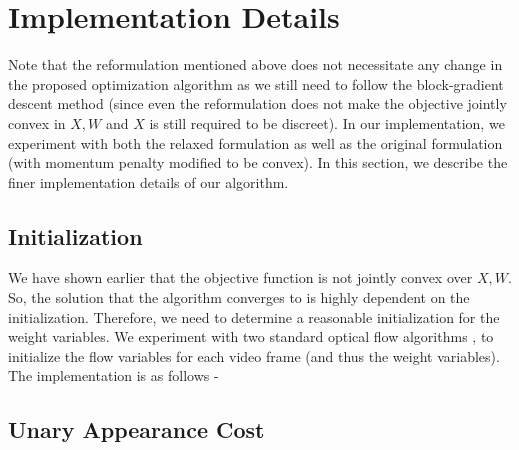 \section{Implementation Details}

Note that the reformulation mentioned above does not necessitate any
change in the proposed optimization algorithm as we still need to
follow the block-gradient descent method (since even the reformulation
does not make the objective jointly convex in $X,W$ and $X$ is still
required to be discreet). In our implementation, we experiment with both the relaxed formulation as well as the original formulation (with momentum penalty modified to be convex). In this section, we describe the finer implementation details of our algorithm.


\subsection{Initialization}

We have shown earlier that the objective function is not jointly convex
over $X,W$. So, the solution that the algorithm converges to is highly
dependent on the initialization. Therefore, we need to determine a
reasonable initialization for the weight variables. We experiment
with two standard optical flow algorithms \cite{HornSchunk}, \cite{LukasKanade} to
initialize the flow variables for each video frame (and thus the weight
variables). The implementation is as follows -

\begin{algorithm}[H]
\caption{$generatePriors(I)$}
\end{algorithm}



\subsection{Unary Appearance Cost}

